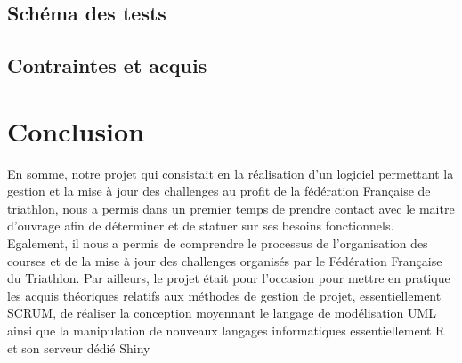\documentclass[12pt,a4paper]{report}
\begin{document}
\subsection {Schéma des tests }

\subsection {Contraintes et acquis }
\newpage
\section* {Conclusion}
En somme, notre projet qui consistait en la réalisation d’un logiciel permettant  la gestion et la mise à jour des challenges au profit de la fédération Française de triathlon, nous a permis dans un premier temps de prendre contact avec le maitre d’ouvrage afin de  déterminer et de statuer sur ses besoins fonctionnels. Egalement, il nous a permis de comprendre le processus de l’organisation des courses et de la mise à jour des challenges organisés par le Fédération Française du Triathlon. Par ailleurs, le projet était pour l’occasion pour mettre en pratique les acquis théoriques relatifs aux méthodes de gestion de projet, essentiellement SCRUM, de réaliser la conception moyennant le langage de modélisation UML ainsi   que la manipulation de nouveaux langages informatiques essentiellement R et son serveur dédié Shiny




	
	
\end{document}
